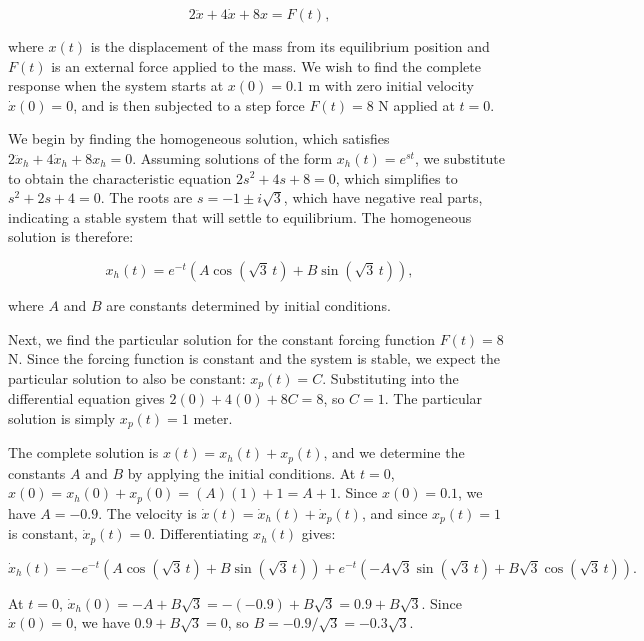 \begin{equation}
2\ddot{x} + 4\dot{x} + 8x = F(t),
\end{equation}

where $x(t)$ is the displacement of the mass from its equilibrium position and $F(t)$ is an external force applied to the mass. We wish to find the complete response when the system starts at $x(0) = 0.1$ m with zero initial velocity $\dot{x}(0) = 0$, and is then subjected to a step force $F(t) = 8$ N applied at $t = 0$.

We begin by finding the homogeneous solution, which satisfies $2\ddot{x}_h + 4\dot{x}_h + 8x_h = 0$. Assuming solutions of the form $x_h(t) = e^{st}$, we substitute to obtain the characteristic equation $2s^2 + 4s + 8 = 0$, which simplifies to $s^2 + 2s + 4 = 0$. The roots are $s = -1 \pm i\sqrt{3}$, which have negative real parts, indicating a stable system that will settle to equilibrium. The homogeneous solution is therefore:

\begin{equation}
x_h(t) = e^{-t}\left(A \cos(\sqrt{3}\,t) + B \sin(\sqrt{3}\,t)\right),
\end{equation}

where $A$ and $B$ are constants determined by initial conditions.

Next, we find the particular solution for the constant forcing function $F(t) = 8$ N. Since the forcing function is constant and the system is stable, we expect the particular solution to also be constant: $x_p(t) = C$. Substituting into the differential equation gives $2(0) + 4(0) + 8C = 8$, so $C = 1$. The particular solution is simply $x_p(t) = 1$ meter.

The complete solution is $x(t) = x_h(t) + x_p(t)$, and we determine the constants $A$ and $B$ by applying the initial conditions. At $t = 0$, $x(0) = x_h(0) + x_p(0) = (A)(1) + 1 = A + 1$. Since $x(0) = 0.1$, we have $A = -0.9$. The velocity is $\dot{x}(t) = \dot{x}_h(t) + \dot{x}_p(t)$, and since $x_p(t) = 1$ is constant, $\dot{x}_p(t) = 0$. Differentiating $x_h(t)$ gives:

\begin{equation}
\dot{x}_h(t) = -e^{-t}\left(A \cos(\sqrt{3}\,t) + B \sin(\sqrt{3}\,t)\right) + e^{-t}\left(-A\sqrt{3}\sin(\sqrt{3}\,t) + B\sqrt{3}\cos(\sqrt{3}\,t)\right).
\end{equation}

At $t = 0$, $\dot{x}_h(0) = -A + B\sqrt{3} = -(-0.9) + B\sqrt{3} = 0.9 + B\sqrt{3}$. Since $\dot{x}(0) = 0$, we have $0.9 + B\sqrt{3} = 0$, so $B = -0.9/\sqrt{3} = -0.3\sqrt{3}$.

